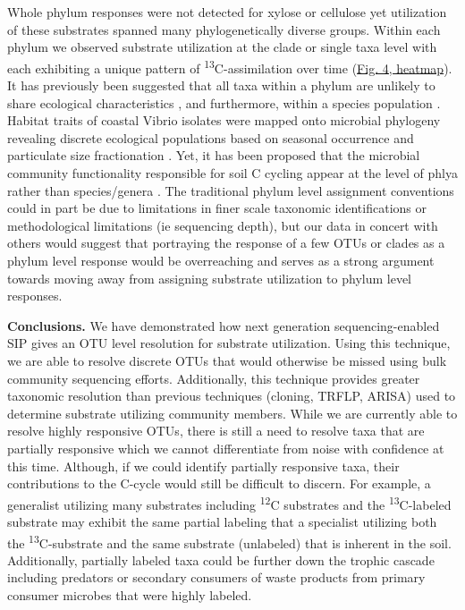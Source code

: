 Whole phylum responses were not detected for xylose or cellulose yet utilization of these substrates spanned many phylogenetically diverse groups. Within each phylum we observed substrate utilization at the clade or single taxa level with each exhibiting a unique pattern of \textsuperscript{13}C-assimilation over time (\href{https://authorea.com/users/3537/articles/3612/master/file/figures/bacteria_tree/bacteria_tree.png}{Fig. 4, heatmap}). It has previously been suggested that all taxa within a phylum are unlikely to share ecological characteristics \cite{Fierer_2007}, and furthermore, within a species population \cite{Choudoir_2012,Preheim_2011,Hunt_2008}. Habitat traits of coastal Vibrio isolates were mapped onto microbial phylogeny revealing discrete ecological populations based on seasonal occurrence and particulate size fractionation \cite{Preheim_2011,Hunt_2008}. Yet, it has been proposed that the microbial community functionality responsible for soil C cycling appear at the level of phlya rather than species/genera \cite{Schimel_2012}. The traditional phylum level assignment conventions could in part be due to limitations in finer scale taxonomic identifications or methodological limitations (ie sequencing depth), but our data in concert with others \cite{Goldfarb_2011,Fierer_2007,Choudoir_2012,Preheim_2011,Hunt_2008} would suggest that portraying the response of a few OTUs or clades as a phylum level response would be overreaching and serves as a strong argument towards moving away from assigning substrate utilization to phylum level responses.

\textbf{Conclusions.} We have demonstrated how next generation sequencing-enabled SIP gives an OTU level resolution for substrate utilization. Using this technique, we are able to resolve discrete OTUs that would otherwise be missed using bulk community sequencing efforts. Additionally, this technique provides greater taxonomic resolution than previous techniques (cloning, TRFLP, ARISA) used to determine substrate utilizing community members. While we are currently able to resolve highly responsive OTUs, there is still a need to resolve taxa that are partially responsive which we cannot differentiate from noise with confidence at this time. Although, if we could identify partially responsive taxa, their contributions to the C-cycle would still be difficult to discern. For example, a generalist utilizing many substrates including \textsuperscript{12}C substrates and the \textsuperscript{13}C-labeled substrate may exhibit the same partial labeling that a specialist utilizing both the \textsuperscript{13}C-substrate and the same substrate (unlabeled) that is inherent in the soil. Additionally, partially labeled taxa could be further down the trophic cascade including predators or secondary consumers of waste products from primary consumer microbes that were highly labeled.   

